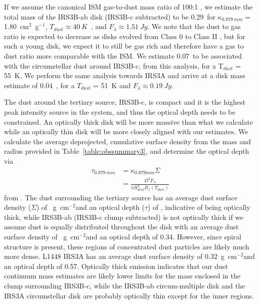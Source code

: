 If we assume the canonical ISM gas-to-dust mass ratio of 100:1 \citep{1978ApJ...224..132B}, we estimate the total mass of the IRS3B-ab disk (IRS3B-c subtracted) to be 0.29~\solm\space for $\kappa_{0.879~mm}=$1.80~cm$^2$~g$^{-1}$, $T_{dust}\approx40~K$~\citep{2019ApJ...886....6T}, and $F_{\lambda}\approx1.51~Jy$. We note that the dust to gas ratio is expected to decrease as disks evolved from Class 0 to Class II \citep{2014ApJ...788...59W}, but for such a young disk, we expect it to still be gas rich and therefore have a gas to dust ratio more comparable with the ISM. We estimate 0.07~\solm\space to be associated with the circumstellar dust around IRS3B-c, from this analysis, for a T$_{dust}$ = 55~K. We perform the same analysis towards IRS3A and arrive at a disk mass estimate of 0.04~\solm, for a $T_{dust}$ = 51~K and $F_{\lambda}\approx0.19~Jy$.

The dust around the tertiary source, IRS3B-c, is compact and it is the highest peak intensity source in the system, and thus the optical depth needs to be constrained. An optically thick disk will be more massive than what we calculate while an optically thin disk will be more closely aligned with our estimates. We calculate the average deprojected, cumulative surface density from the mass and radius provided in Table~\ref{table:obssummary3}, and determine the optical depth via 
\begin{align*}
\tau_{0.879~mm} &= \kappa_{0.879 mm}\Sigma \\
 &=\frac{D^2 F_{\lambda}}{\pi R_{disk}^{2}B_{\lambda}(T_{dust})}
\end{align*}
from \citep{2016Natur.538..483T}. The dust surrounding the tertiary source has an average dust surface density ($\Sigma$) of ~g~cm$^{-2}$\space and an optical depth ($\tau$) of , indicative of being optically thick, while IRS3B-ab (IRS3B-c clump subtracted) is not optically thick if we assume dust is equally distributed throughout the disk with an average dust surface density of ~g~cm$^{-2}$\space and an optical depth of 0.34. However, since spiral structure is present, these regions of concentrated dust particles are likely much more dense. L1448 IRS3A has an average dust surface density of 0.32~g~cm$^{-2}$\space and an optical depth of 0.57. Optically thick emission indicates that our dust continuum mass estimates are likely lower limits for the mass enclosed in the clump surrounding IRS3B-c, while the IRS3B-ab circum-multiple disk and the IRS3A circumstellar disk are probably optically thin except for the inner regions. 


